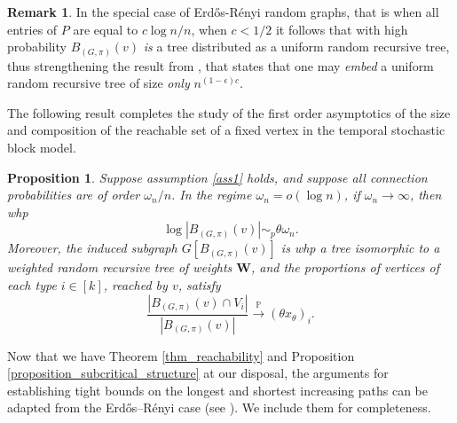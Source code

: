 \documentclass[11pt]{article}
\numberwithin{equation}{section}
\newtheorem{proposition}[theorem]{Proposition}
\theoremstyle{definition}
\newtheorem{remark}[theorem]{Remark}
\newcommand\bN{{\mathbb N}}
\newcommand\bP{{\mathbb P}}
\begin{document}
\begin{remark} In the special case of Erd\H os-R\'enyi random graphs, that is when all entries of $P$ are equal to $c\log n/n$, when $c<1/2$ it follows that with high probability $B_{(G,\pi)}(v)$ \emph{is} a tree distributed as a uniform random recursive tree, thus strengthening the result from \cite{BKL24}, that states that one may \emph{embed} a uniform random recursive tree of size \emph{only} $n^{(1-\epsilon)c}$.\end{remark}


The following result completes the study of the first order asymptotics of the size and composition of the reachable set of a fixed vertex in the temporal stochastic block model.

\begin{proposition}
\label{proposition_subcritical}
Suppose assumption \ref{ass1} holds, and suppose all connection probabilities are of order $\omega_n/n$. In the regime $\omega_n = o(\log n)$, if $\omega_n \to \infty$, then whp $$\log |B_{(G,\pi)}(v)| \sim_p \theta \omega_n.$$
Moreover, the induced subgraph $G[B_{(G,\pi)}(v)]$ is whp a tree isomorphic to a weighted random recursive tree of weights $\boldsymbol{W}$, and the proportions of vertices of each type $i \in [k]$, reached by $v$, satisfy $$ \frac{|B_{(G,\pi)}(v)\cap V_i|}{|B_{(G,\pi)}(v)|} \overset{\bP}{\longrightarrow} (\theta x_\theta)_i.$$
\end{proposition} 

Now that we have Theorem \ref{thm_reachability} and Proposition \ref{proposition_subcritical_structure} at our disposal, the arguments for establishing tight bounds on the longest and shortest increasing paths can be adapted from the Erd\H os–R\' enyi case (see \cite{BKL24}). We include them for completeness.
\end{document}
